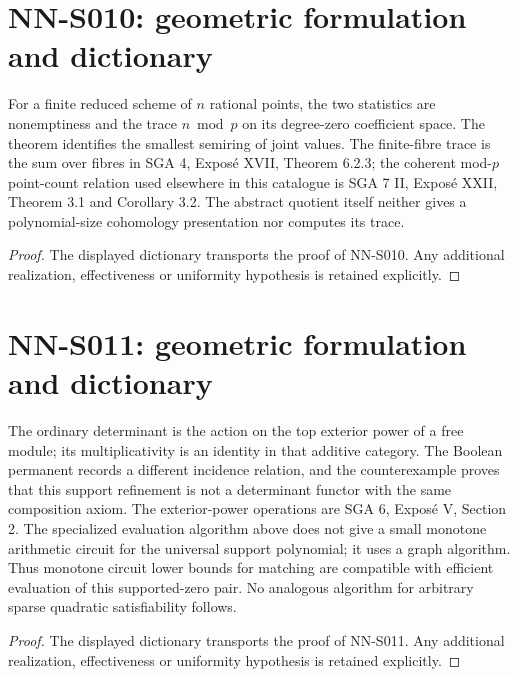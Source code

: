 \section{NN-S010: geometric formulation and dictionary}
\begin{geometricstatement}[NN-S010]
For a finite reduced scheme of $n$ rational points, the two
statistics are nonemptiness and the trace $n\bmod p$ on its
degree-zero coefficient space. The theorem identifies the
smallest semiring of joint values. The finite-fibre trace is
the sum over fibres in SGA 4, Expos\'e XVII, Theorem 6.2.3;
the coherent mod-$p$ point-count relation used elsewhere in
this catalogue is SGA 7 II, Expos\'e XXII, Theorem 3.1 and
Corollary 3.2. The abstract quotient itself neither gives a
polynomial-size cohomology presentation nor computes its trace.
\end{geometricstatement}
\begin{proof} The displayed dictionary transports the proof of NN-S010. Any additional realization, effectiveness or uniformity hypothesis is retained explicitly.\end{proof}


\section{NN-S011: geometric formulation and dictionary}
\begin{geometricstatement}[NN-S011]
The ordinary determinant is the action on the top exterior power
of a free module; its multiplicativity is an identity in that
additive category. The Boolean permanent records a different
incidence relation, and the counterexample proves that this
support refinement is not a determinant functor with the same
composition axiom. The exterior-power operations are SGA 6,
Expos\'e V, Section 2. The specialized evaluation algorithm above
does not give a small monotone arithmetic circuit for the
universal support polynomial; it uses a graph algorithm. Thus
monotone circuit lower bounds for matching are compatible with
efficient evaluation of this supported-zero pair. No analogous
algorithm for arbitrary sparse quadratic satisfiability follows.
\end{geometricstatement}
\begin{proof} The displayed dictionary transports the proof of NN-S011. Any additional realization, effectiveness or uniformity hypothesis is retained explicitly.\end{proof}


